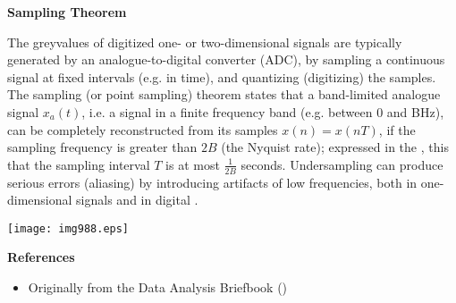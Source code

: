 \documentclass[12pt]{article}
\begin{document}
{\bf Sampling Theorem}

The greyvalues of digitized one- or two-dimensional signals are typically generated by an analogue-to-digital converter (ADC), by sampling a continuous signal at fixed intervals (e.g. in time), and quantizing (digitizing) the samples. The sampling (or point sampling) theorem states that a band-limited analogue signal $x_a(t)$, i.e. a signal in a finite frequency band (e.g. between 0 and BHz), can be completely reconstructed from its samples $x(n) = x(nT)$, if the sampling frequency is greater than $2B$ (the Nyquist rate); expressed in the , this  that the sampling interval $T$ is at most $\frac{1}{2B}$ seconds. Undersampling can produce serious errors (aliasing) by introducing artifacts of low frequencies, both in one-dimensional signals and in digital .

\begin{center}
\texttt{[image: img988.eps]}
\end{center}

{\bf References}
\begin{itemize}
\item Originally from the Data Analysis Briefbook ()
\end{itemize}
\end{document}
